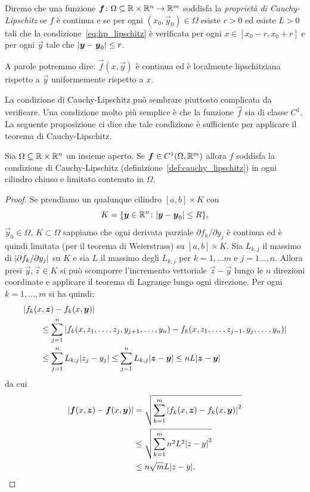 \begin{definition}%
\label{def:cauchy_lipschitz}%
Diremo che una funzione $\boldsymbol f\colon \Omega\subseteq {\mathbb R}\times {\mathbb R}^n \to {\mathbb R}^m$
soddisfa la \emph{proprietà di Cauchy-Lipschitz}%
 se $f$ è continua e se
per ogni $(x_0,\vec y_0)\in \Omega$ esiste $r>0$ ed esiste $L>0$
tali che la condizione~\eqref{eq:hp_lipschitz} è verificata 
per ogni $x\in [x_0-r, x_0+r]$ e per ogni $\vec y$ tale 
che ${\left|\boldsymbol y-\boldsymbol y_0\right|}\le r$.

A parole potremmo dire: $\vec f(x,\vec y)$ è continua ed è 
localmente lipschitziana rispetto a $\vec y$ uniformemente
rispetto a $x$.
\end{definition}
 
La condizione di Cauchy-Lipschitz può sembrare piuttosto complicata
da verificare. Una condizione molto più semplice  è che la funzione $\vec f$
sia di classe $C^1$. La seguente proposizione ci dice che tale
condizione è sufficiente per applicare il teorema di Cauchy-Lipschitz.

\begin{proposition}%
\mymark{***}%
Sia $\Omega \subseteq {\mathbb R}\times {\mathbb R}^n$ un insieme aperto.
Se $\boldsymbol f\in C^1(\Omega,{\mathbb R}^m)$ 
allora $f$ soddisfa la condizione
di Cauchy-Lipschitz (definizione~\ref{def:cauchy_lipschitz})
in ogni cilindro chiuso e limitato contenuto in $\Omega$.
\end{proposition}
%
\begin{proof}
\mymark{***}%
Se prendiamo un qualunque cilindro $[a,b]\times K$ con 
\[
  K={\left\{ \boldsymbol y\in {\mathbb R}^n\colon {\left|\boldsymbol y-\boldsymbol y_0\right|}\le R \right\}}, 
\]
$\vec y_0\in \Omega$, $K\subset \Omega$
sappiamo che ogni derivata parziale
$\partial f_k / \partial y_j$ è continua ed è quindi limitata
(per il teorema di Weierstrass) su $[a,b]\times K$. 
Sia $L_{k,j}$ il massimo di ${\left|\partial f_k / \partial y_j\right|}$ su $K$ e sia
$L$ il massimo degli $L_{k,j}$ per $k=1,\dots m$ e $j=1\dots,n$.
Allora presi $\vec y, \vec z\in K$ si può scomporre l'incremento vettoriale 
$\vec z - \vec y$ lungo le $n$ direzioni coordinate e applicare il teorema di Lagrange lungo ogni direzione.
Per ogni $k = 1,\dots, m$ si ha quindi:
\begin{align*}
\MoveEqLeft
\abs{f_k(x,\vec z)-f_k(x,\vec y)}\\
&\le \sum_{j=1}^n \abs{f_k(x,z_1, \dots, z_j, y_{j+1}, \dots, y_n) - f_k(x,z_1, \dots, z_{j-1}, y_j, \dots, y_n)}\\
&\le \sum_{j=1}^n L_{k,j} \abs{z_j-y_j}
\le \sum_{j=1}^n L_{k,j} \abs{\vec z-\vec y}
\le n L \abs{\vec z-\vec y}
\end{align*}
da cui
\begin{align*}
  {\left|\boldsymbol f(x,\boldsymbol z) - \boldsymbol f(x,\boldsymbol y)\right|}
  &= \sqrt{\sum_{k=1}^m {\left|f_k(x,\boldsymbol z) - f_k(x,\boldsymbol y)\right|}^2} \\
  &\le \sqrt{\sum_{k=1}^m n^2 L^2 {\left|z-y\right|}^2} \\
  &\le n\sqrt{m} L {\left|z-y\right|}.
\end{align*}
\end{proof}

